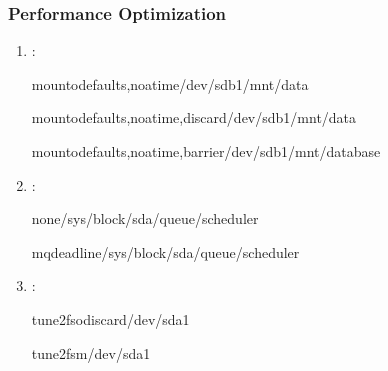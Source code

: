 \documentclass[letterpaper,10pt,english]{sphinxmanual}
\begin{document}
\subsubsection{Performance Optimization}
\label{\detokenize{file-systems:performance-optimization}}\begin{enumerate}
%
\item {} 
\sphinxAtStartPar
{}:

\begin{sphinxVerbatim}[commandchars=\\\{\}]
mount\PYGZhy{}odefaults,noatime/dev/sdb1/mnt/data

mount\PYGZhy{}odefaults,noatime,discard/dev/sdb1/mnt/data

mount\PYGZhy{}odefaults,noatime,barrier/dev/sdb1/mnt/database
\end{sphinxVerbatim}

\item {} 
\sphinxAtStartPar
{}:

\begin{sphinxVerbatim}[commandchars=\\\{\}]
none\PYGZgt{}/sys/block/sda/queue/scheduler

mq\PYGZhy{}deadline\PYGZgt{}/sys/block/sda/queue/scheduler
\end{sphinxVerbatim}

\item {} 
\sphinxAtStartPar
{}:

\begin{sphinxVerbatim}[commandchars=\\\{\}]
tune2fs\PYGZhy{}odiscard/dev/sda1

tune2fs\PYGZhy{}m/dev/sda1
\end{sphinxVerbatim}

\end{enumerate}
\end{document}

